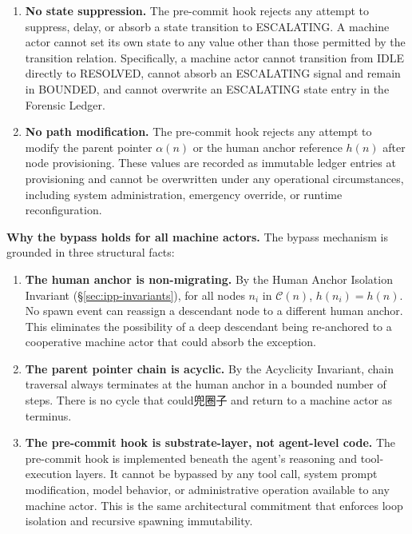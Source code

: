 \begin{enumerate}
    \item[(B1)] \textbf{No state suppression.} The pre-commit hook rejects any attempt to suppress, delay, or absorb a state transition to ESCALATING. A machine actor cannot set its own state to any value other than those permitted by the transition relation. Specifically, a machine actor cannot transition from IDLE directly to RESOLVED, cannot absorb an ESCALATING signal and remain in BOUNDED, and cannot overwrite an ESCALATING state entry in the Forensic Ledger.

    \item[(B2)] \textbf{No path modification.} The pre-commit hook rejects any attempt to modify the parent pointer $\alpha(n)$ or the human anchor reference $h(n)$ after node provisioning. These values are recorded as immutable ledger entries at provisioning and cannot be overwritten under any operational circumstances, including system administration, emergency override, or runtime reconfiguration.
\end{enumerate}

\bigskip
\noindent\textbf{Why the bypass holds for all machine actors.} The bypass mechanism is grounded in three structural facts:

\begin{enumerate}
    \item[(BM1)] \textbf{The human anchor is non-migrating.} By the Human Anchor Isolation Invariant (\S\ref{sec:ipp-invariants}), for all nodes $n_i$ in $\mathcal{C}(n)$, $h(n_i) = h(n)$. No spawn event can reassign a descendant node to a different human anchor. This eliminates the possibility of a deep descendant being re-anchored to a cooperative machine actor that could absorb the exception.

    \item[(BM2)] \textbf{The parent pointer chain is acyclic.} By the Acyclicity Invariant, chain traversal always terminates at the human anchor in a bounded number of steps. There is no cycle that could兜圈子 and return to a machine actor as terminus.

    \item[(BM3)] \textbf{The pre-commit hook is substrate-layer, not agent-level code.} The pre-commit hook is implemented beneath the agent's reasoning and tool-execution layers. It cannot be bypassed by any tool call, system prompt modification, model behavior, or administrative operation available to any machine actor. This is the same architectural commitment that enforces loop isolation and recursive spawning immutability.
\end{enumerate}

